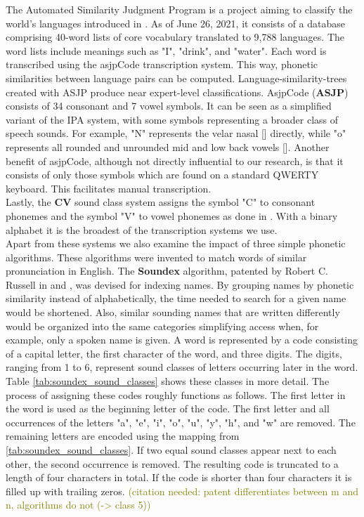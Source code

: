 The Automated Similarity Judgment Program is a project aiming to classify the world's languages introduced in \cite{brown2008asjpCode}.
As of June 26, 2021, it consists of a database comprising 40-word lists of core vocabulary translated to 9,788 languages.
The word lists include meanings such as "I", "drink", and "water".
Each word is transcribed using the asjpCode transcription system.
This way, phonetic similarities between language pairs can be computed.
Language-similarity-trees created with ASJP produce near expert-level classifications.
AsjpCode (\textbf{ASJP}) consists of 34 consonant and 7 vowel symbols.
It can be seen as a simplified variant of the IPA system, with some symbols representing a broader class of speech sounds.
For example, "N" represents the velar nasal [] directly, while "o" represents all rounded and unrounded mid and low back vowels [].
Another benefit of asjpCode, although not directly influential to our research, is that it consists of only those symbols which are found on a standard QWERTY keyboard.
This facilitates manual transcription.\\
Lastly, the \textbf{CV} sound class system assigns the symbol "C" to consonant phonemes and the symbol "V" to vowel phonemes as done in \cite{list2017lingpy}.
With a binary alphabet it is the broadest of the transcription systems we use.\\

Apart from these systems we also examine the impact of three simple phonetic algorithms.
These algorithms were invented to match words of similar pronunciation in English.
The \textbf{Soundex} algorithm, patented by Robert C. Russell in \cite{russel1918soundex} and \cite{russel1922soundex}, was devised for indexing names.
By grouping names by phonetic similarity instead of alphabetically, the time needed to search for a given name would be shortened.
Also, similar sounding names that are written differently would be organized into the same categories simplifying access when, for example, only a spoken name is given.
A word is represented by a code consisting of a capital letter, the first character of the word, and three digits.
The digits, ranging from 1 to 6, represent sound classes of letters occurring later in the word.
Table \ref{tab:soundex_sound_classes} shows these classes in more detail.
The process of assigning these codes roughly functions as follows.
The first letter in the word is used as the beginning letter of the code.
The first letter and all occurrences of the letters "a", "e", "i", "o", "u", "y", "h", and "w" are removed.
The remaining letters are encoded using the mapping from \ref{tab:soundex_sound_classes}.
If two equal sound classes appear next to each other, the second occurrence is removed.
The resulting code is truncated to a length of four characters in total.
If the code is shorter than four characters it is filled up with trailing zeros.
\textcolor{olive}{(citation needed: patent differentiates between m and n, algorithms do not (-> class 5))}\\

